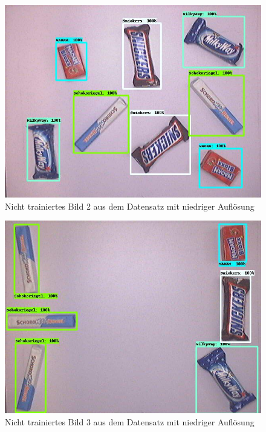     \begin{figure}[H]
        \centering
        \includegraphics[angle = 90, width = \textwidth]{Bilder/models/model_comparison/faster_rcnn_resnet101_v1_640x640_coco17_tpu-8/non_trained_2.jpg}
        \caption{Nicht trainiertes Bild 2 aus dem Datensatz mit niedriger Auflösung}
    \end{figure}
    
    \begin{figure}[H]
        \centering
        \includegraphics[angle = 90, width = \textwidth]{Bilder/models/model_comparison/faster_rcnn_resnet101_v1_640x640_coco17_tpu-8/non_trained_3.jpg}
        \caption{Nicht trainiertes Bild 3 aus dem Datensatz mit niedriger Auflösung}
    \end{figure}
    
